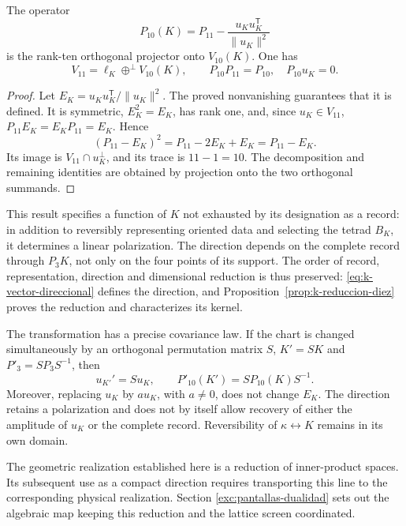 \begin{proposition}
\label{prop:k-reduccion-diez}
The operator
\begin{equation}
 P_{10}(K)=P_{11}
       -\frac{u_Ku_K^{\mathsf T}}{\lVert u_K\rVert^2}
 \label{eq:k-proyector-diez}
\end{equation}
is the rank-ten orthogonal projector onto \(V_{10}(K)\). One has
\[
 V_{11}=\ell_K\mathbin{\oplus^{\perp}}V_{10}(K),
 \qquad P_{10}P_{11}=P_{10},\quad P_{10}u_K=0.
\]
\end{proposition}
\begin{proof}
Let \(E_K=u_Ku_K^{\mathsf T}/\lVert u_K\rVert^2\). The
proved nonvanishing guarantees that it is defined. It is symmetric,
\(E_K^2=E_K\), has rank one, and, since \(u_K\in V_{11}\),
\(P_{11}E_K=E_KP_{11}=E_K\). Hence
\[
 (P_{11}-E_K)^2=P_{11}-2E_K+E_K=P_{11}-E_K.
\]
Its image is \(V_{11}\cap u_K^\perp\), and its trace is
\(11-1=10\). The decomposition and remaining identities are
obtained by projection onto the two orthogonal summands.
\end{proof}

This result specifies a function of \(K\) not exhausted by its designation as
a record: in addition to reversibly representing oriented
data and selecting the tetrad \(B_K\), it determines a
linear polarization. The direction depends on the complete record
through \(P_3K\), not only on the four points of its support.
The order of record, representation, direction and dimensional
reduction is thus preserved: \eqref{eq:k-vector-direccional} defines
the direction, and Proposition~\ref{prop:k-reduccion-diez} proves
the reduction and characterizes its kernel.

The transformation has a precise covariance law. If the chart is
changed simultaneously by an orthogonal permutation matrix \(S\),
\(K'=SK\) and \(P'_3=SP_3S^{-1}\), then
\[
 u_{K'}'=Su_K,\qquad P'_{10}(K')=SP_{10}(K)S^{-1}.
\]
Moreover, replacing \(u_K\) by \(a u_K\), with \(a\ne0\),
does not change \(E_K\). The direction retains a polarization and does not
by itself allow recovery of either the amplitude of \(u_K\) or the
complete record. Reversibility of \(\kappa\leftrightarrow K\)
remains in its own domain.

The geometric realization established here is a reduction of inner-product
spaces. Its subsequent use as a compact direction
requires transporting this line to the corresponding physical realization.
Section \ref{exc:pantallas-dualidad} sets out the algebraic map
keeping this reduction and the lattice screen coordinated.

